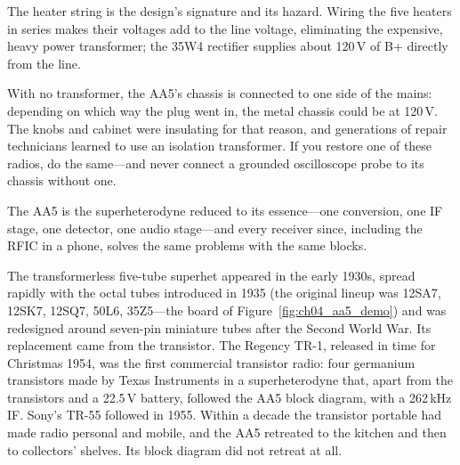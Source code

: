
The heater string is the design's signature and its hazard. Wiring the five heaters in series makes their
voltages add to the line voltage, eliminating the expensive, heavy power transformer; the 35W4 rectifier
supplies about 120\,V of B+ directly from the line.

\begin{pitfall}
With no transformer, the AA5's chassis is connected to one side of the mains: depending on which way the
plug went in, the metal chassis could be at 120\,V. The knobs and cabinet were insulating for that reason, and
generations of repair technicians learned to use an isolation transformer. If you restore one of these
radios, do the same---and never connect a grounded oscilloscope probe to its chassis without one.
\end{pitfall}

The AA5 is the superheterodyne reduced to its essence---one conversion, one IF stage, one detector, one audio
stage---and every receiver since, including the RFIC in a phone, solves the same problems with the same
blocks.

\begin{history}
The transformerless five-tube superhet appeared in the early 1930s, spread rapidly with the octal tubes
introduced in 1935 (the original lineup was 12SA7, 12SK7, 12SQ7, 50L6, 35Z5---the board of
Figure~\ref{fig:ch04_aa5_demo}) and was redesigned around seven-pin miniature tubes after the Second World War.
Its replacement came from the transistor. The Regency TR-1, released in time for Christmas 1954, was the
first commercial transistor radio: four germanium transistors made by Texas Instruments in a superheterodyne
that, apart from the transistors and a 22.5\,V battery, followed the AA5 block diagram, with a 262\,kHz IF.
Sony's TR-55 followed in 1955. Within a decade the transistor portable had made radio personal and mobile, and
the AA5 retreated to the kitchen and then to collectors' shelves. Its block diagram did not retreat at all.
\end{history}

